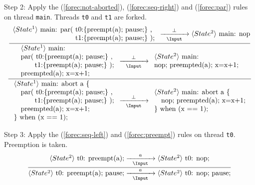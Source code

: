 \noindent
Step 2: Apply the (\ref{forec:not-aborted}), (\ref{forec:seq-right}) and 
(\ref{forec:par}) rules on thread \verb$main$. Threads \verb$t0$ and 
\verb$t1$ are forked.
\begin{equation*}
	\frac{
		\dfrac{
				\begin{array}{l}
					\langle State^1 \rangle ~ \text{main: par( t0:\{preempt(a); pause;\} ,}	 \\
					\text{~~~~~~~~~~~~~~~~~~~~~~~~~~~t1:\{preempt(a); pause;\} );}
				\end{array}
					\xrightarrow[~~\Input~~]{\bot} 
				\langle State^2 \rangle ~ \text{main: nop}
			}{
				\begin{array}{l}
					\langle State^1 \rangle ~ \text{main:}		\\
					\text{par( t0:\{preempt(a); pause;\} ,}		\\
					\text{~~~~~~t1:\{preempt(a); pause;\} );}	\\
					\text{preempted(a); x=x+1;}					
				\end{array}
					\xrightarrow[~~\Input~~]{\bot} 
				\begin{array}{l}
					\langle State^2 \rangle ~ \text{main:}			\\
					\text{nop; preempted(a); x=x+1;}				
				\end{array}
			}
		}{
			\begin{array}{l}
				\langle State^1 \rangle ~ \text{main: abort a \{}	\\
				\text{~~~par( t0:\{preempt(a); pause;\} ,}			\\
				\text{~~~~~~~~~t1:\{preempt(a); pause;\} );}		\\
				\text{~~~preempted(a); x=x+1;}						\\
				\text{\} when (x == 1);}							
			\end{array}
				\xrightarrow[~~\Input~~]{\bot} 
			\begin{array}{l}
				\langle State^2 \rangle ~ \text{main: abort a \{}	\\
				\text{~~~nop; preempted(a); x=x+1;}					\\
				\text{\} when (x == 1);}							
			\end{array}
		}
\end{equation*}

\noindent
Step 3: Apply the (\ref{forec:seq-left}) and (\ref{forec:preempt}) rules 
on thread \verb$t0$. Preemption is taken.
\begin{equation*}
	\frac{
		\langle State^2 \rangle ~ \text{t0: preempt(a);}
			\xrightarrow[~~\Input~~]{~~a~~} 
		\langle State^2 \rangle ~ \text{t0: nop;}
	}{
		\langle State^2 \rangle ~ \text{t0: preempt(a); pause;}
			\xrightarrow[~~\Input~~]{~~a~~} 
		\langle State^2 \rangle ~ \text{t0: nop; pause;}
	}
\end{equation*}

